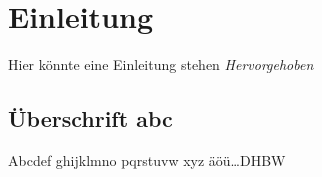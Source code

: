 \chapter{Einleitung}


Hier könnte eine Einleitung stehen \emph{Hervorgehoben} 
 
\section{Überschrift abc}
 Abcdef ghijklmno pqrstuvw xyz äöü\ldots \gls{DHBW}
%  
% 
% 
% 
